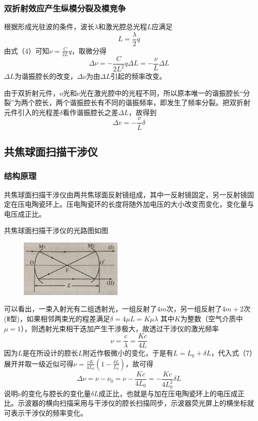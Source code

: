 \documentclass[UTF8]{ctexart}
\begin{document}
\begin{multicols}{2}
\subsubsection{双折射效应产生纵模分裂及模竞争}
根据形成光驻波的条件，波长$\lambda$和激光腔总光程$L$应满足
\begin{equation}
L=\frac{\lambda}{2}q
\end{equation}
由式（4）可知$\nu=\frac{C}{2 L} q$，取微分得
\begin{equation}
\Delta \nu=-\frac{C}{2 L^{2}} q \Delta L=-\frac{\nu}{L} \Delta L
\end{equation}
$\Delta L$为谐振腔长的改变，$\Delta \nu$为由$\Delta L$引起的频率改变。

由于双折射元件，o光和e光在激光腔中的光程不同，所以原本唯一的谐振腔长“分裂”为两个腔长，两个谐振腔长有不同的谐振频率，即发生了频率分裂。把双折射元件引入的光程差$\delta$看作谐振腔长之差$\Delta L$，故得到
\begin{equation}
\Delta v=-\frac{v}{L} \delta
\end{equation}

\subsection{共焦球面扫描干涉仪}
\subsubsection{结构原理}
共焦球面扫描干涉仪由两共焦球面反射镜组成，其中一反射镜固定，另一反射镜固定在压电陶瓷环上。压电陶瓷环的长度将随外加电压的大小改变而变化，变化量与电压成正比。

共焦球面扫描干涉仪的光路图如图
\begin{figure}[H]
\centering
\includegraphics[width=5cm]{lightpath}
\end{figure}
可以看出，一束入射光有二组透射光，一组反射了$4m$次，另一组反射了$4m+2$次(Ⅱ型)，如果相邻两束光的程差满足$\delta=4\mu L=K\mu\lambda$
其中$K$为整数（空气介质中$\mu=1$），则透射光束相干迭加产生干涉极大，故透过干涉仪的激光频率
\begin{equation}
\nu=\frac{c}{\lambda}=\frac{K c}{4 L}
\end{equation}
因为$L$是在所设计的腔长$L$附近作极微小的变化，于是有$L=L_{0}+\delta L$，代入式（7）展开并取一级近似可得$\nu=\frac{c K}{4 L_{0}}\left(1-\frac{\delta L}{L_{0}}\right)$，故可得
\begin{equation}
\Delta \nu=\nu-\nu_0=\nu-\frac{Kc}{4 L_{0}}=-\frac{Kc}{4 L_{0}^{2}} \delta L
\end{equation}
说明$\nu$的变化与腔长的变化量$\delta L$成正比，也就是与加在压电陶瓷环上的电压成正比。示波器的横向扫描采用与干涉仪的腔长扫描同步，示波器荧光屏上的横坐标就可表示干涉仪的频率变化。


\end{multicols}
\end{document}
